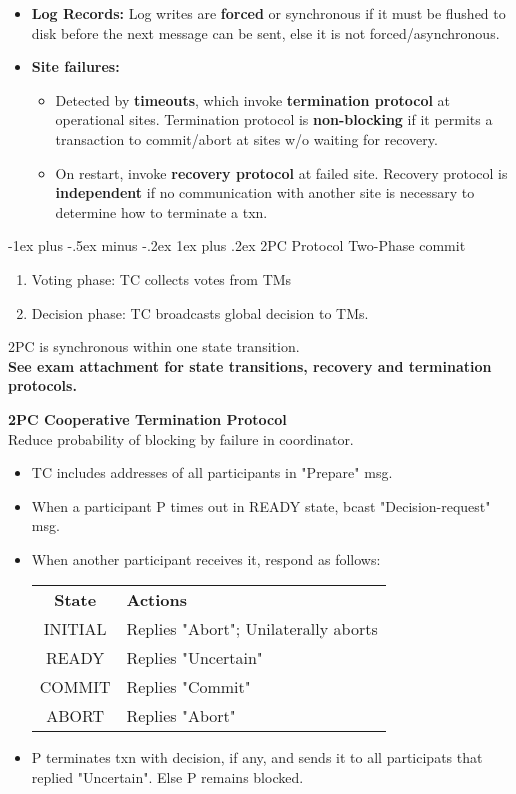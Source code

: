 \documentclass[8pt, landscape]{extarticle}
\makeatletter
\renewcommand{\subsubsection}{\@startsection{subsubsection}{3}{0mm}%
  {-1ex plus -.5ex minus -.2ex}%
  {1ex plus .2ex}%
{\normalfont\small\bfseries}}%
\makeatother
\begin{document}
\begin{multicols*}{4}
\begin{itemize}
\begin{itemize}
        \item \textbf{Log Records:} Log writes are \textbf{forced} or synchronous if it must be flushed to disk before the next message can be sent, else it is not forced/asynchronous.
        \item \textbf{Site failures:}
        \begin{itemize}
            \item Detected by \textbf{timeouts}, which invoke \textbf{termination protocol} at operational sites. Termination protocol is \textbf{non-blocking} if it permits a transaction to commit/abort at sites w/o waiting for recovery.
            \item On restart, invoke \textbf{recovery protocol} at failed site. Recovery protocol is \textbf{independent} if no communication with another site is necessary to determine how to terminate a txn.
        \end{itemize}
    \end{itemize}
\end{itemize}

\subsubsection{2PC Protocol}
Two-Phase commit
\begin{enumerate}
    \item Voting phase: TC collects votes from TMs
    \item Decision phase: TC broadcasts global decision to TMs.
\end{enumerate}
2PC is synchronous within one state transition.\\
\textbf{See exam attachment for state transitions, recovery and termination protocols.}

\textbf{2PC Cooperative Termination Protocol} \\

Reduce probability of blocking by failure in coordinator.
\begin{itemize}
    \item TC includes addresses of all participants in "Prepare" msg.
    \item When a participant P times out in READY state, bcast "Decision-request" msg.
    \item When another participant receives it, respond as follows:
    \begin{tabular}{cl}
        \textbf{State} & \textbf{Actions} \\
        INITIAL & Replies "Abort"; Unilaterally aborts \\
        READY & Replies "Uncertain" \\
        COMMIT & Replies "Commit" \\
        ABORT & Replies "Abort" \\
    \end{tabular}
    \item P terminates txn with decision, if any, and sends it to all participats that replied "Uncertain". Else P remains blocked. 
\end{itemize}


\end{multicols*}
\end{document}
